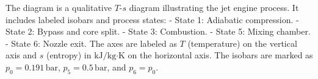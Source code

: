 The diagram is a qualitative \( T \)-\( s \) diagram illustrating the jet engine process. It includes labeled isobars and process states:  
- State 1: Adiabatic compression.  
- State 2: Bypass and core split.  
- State 3: Combustion.  
- State 5: Mixing chamber.  
- State 6: Nozzle exit.  
The axes are labeled as \( T \) (temperature) on the vertical axis and \( s \) (entropy) in \( \text{kJ}/\text{kg·K} \) on the horizontal axis. The isobars are marked as \( p_0 = 0.191 \, \text{bar} \), \( p_5 = 0.5 \, \text{bar} \), and \( p_6 = p_0 \).